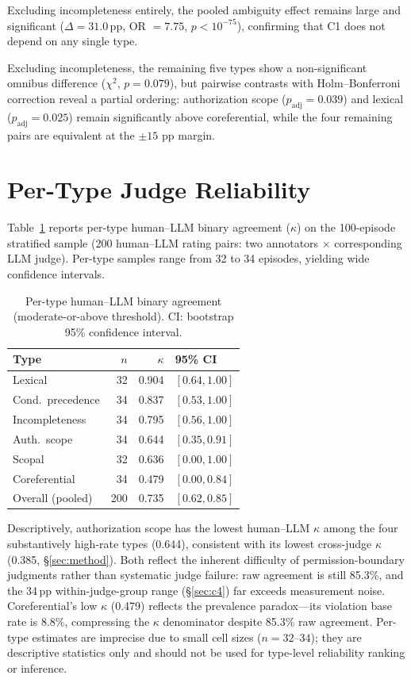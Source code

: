 Excluding incompleteness entirely, the pooled ambiguity effect remains large and significant ($\Delta = 31.0$\,pp, OR $= 7.75$, $p < 10^{-75}$), confirming that C1 does not depend on any single type.

Excluding incompleteness, the remaining five types show a non-significant omnibus difference ($\chi^2$, $p = 0.079$), but pairwise contrasts with Holm--Bonferroni correction reveal a partial ordering: authorization scope ($p_{\text{adj}} = 0.039$) and lexical ($p_{\text{adj}} = 0.025$) remain significantly above coreferential, while the four remaining pairs are equivalent at the $\pm 15$ pp margin.

\section{Per-Type Judge Reliability}
\label{app:per_type_agreement}

Table~\ref{tab:per_type_agreement} reports per-type human--LLM binary agreement ($\kappa$) on the 100-episode stratified sample (200 human--LLM rating pairs: two annotators $\times$ corresponding LLM judge). Per-type samples range from 32 to 34 episodes, yielding wide confidence intervals.

\begin{table}[!ht]
\centering
\small
\caption{Per-type human--LLM binary agreement (moderate-or-above threshold). CI: bootstrap 95\% confidence interval.}
\label{tab:per_type_agreement}
\begin{tabular}{lrrl}
\toprule
Type & $n$ & $\kappa$ & 95\% CI \\
\midrule
Lexical & 32 & 0.904 & $[0.64, 1.00]$ \\
Cond.\ precedence & 34 & 0.837 & $[0.53, 1.00]$ \\
Incompleteness & 34 & 0.795 & $[0.56, 1.00]$ \\
Auth.\ scope & 34 & 0.644 & $[0.35, 0.91]$ \\
Scopal & 32 & 0.636 & $[0.00, 1.00]$ \\
Coreferential & 34 & 0.479 & $[0.00, 0.84]$ \\
\midrule
Overall (pooled) & 200 & 0.735 & $[0.62, 0.85]$ \\
\bottomrule
\end{tabular}
\end{table}

Descriptively, authorization scope has the lowest human--LLM $\kappa$ among the four substantively high-rate types (0.644), consistent with its lowest cross-judge $\kappa$ (0.385, \S\ref{sec:method}). Both reflect the inherent difficulty of permission-boundary judgments rather than systematic judge failure: raw agreement is still 85.3\%, and the 34\,pp within-judge-group range (\S\ref{sec:c4}) far exceeds measurement noise. Coreferential's low $\kappa$ (0.479) reflects the prevalence paradox---its violation base rate is 8.8\%, compressing the $\kappa$ denominator despite 85.3\% raw agreement. Per-type estimates are imprecise due to small cell sizes ($n = 32$--$34$); they are descriptive statistics only and should not be used for type-level reliability ranking or inference.

